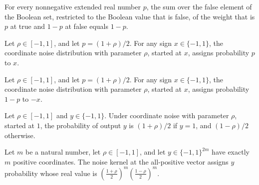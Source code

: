 \begin{theorem}
\label{FABL.sum_bool_filter_false_middleLayer}
\leanok
{}
For every nonnegative extended real number $p$, the sum over the false element of the
Boolean set, restricted to the Boolean value that is false, of the weight that is $p$ at
true and $1-p$ at false equals $1-p$.
\end{theorem}

\begin{theorem}
\label{FABL.coordinateNoisePMF_apply_self_middleLayer}
\leanok
{}
Let $\rho\in[-1,1]$, and let $p=(1+\rho)/2$. For any sign $x\in\{−1,1\}$, the coordinate
noise distribution with parameter $\rho$, started at $x$, assigns probability $p$ to
$x$.
\end{theorem}

\begin{theorem}
\label{FABL.coordinateNoisePMF_apply_neg_middleLayer}
\leanok
{}
Let $\rho\in[-1,1]$, and let $p=(1+\rho)/2$. For any sign $x\in\{−1,1\}$, the coordinate
noise distribution with parameter $\rho$, started at $x$, assigns probability $1-p$ to
$-x$.
\end{theorem}

\begin{theorem}
\label{FABL.coordinateNoisePMF_one_toReal}
\leanok
{}
Let $\rho\in[-1,1]$ and $y\in\{−1,1\}$. Under coordinate noise with parameter $\rho$,
started at $1$, the probability of output $y$ is $(1+\rho)/2$ if $y=1$, and $(1-\rho)/2$
otherwise.
\end{theorem}

\begin{theorem}
\label{FABL.noiseKernel_allOne_middleLayer_mass_toReal}
\leanok
{}
Let $m$ be a natural number, let $\rho\in[-1,1]$, and let $y\in\{-1,1\}^{2m}$ have
exactly $m$ positive coordinates. The noise kernel at the all-positive vector assigns
$y$ probability whose real value is
$\left(\frac{1+\rho}{2}\right)^m\left(\frac{1-\rho}{2}\right)^m$.
\end{theorem}

